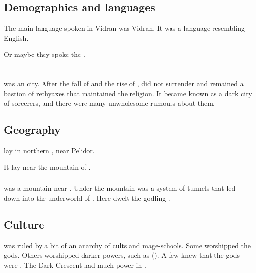 \subsection{Demographics and languages}
The main language spoken in Vidran was Vidran. 
It was a \human language resembling English. 

Or maybe they spoke the .















\section{\Yormis}
\index{\Yormis}
\Yormis was an \Ortaican city.
After the fall of \Ortaica and the rise of \Iquinian \Tepharae, \Yormis did not surrender and remained a bastion of rethyaxes that maintained the \Ortaican religion.
It became known as a dark city of sorcerers, and there were many unwholesome rumours about them.









\subsection{Geography}
\Yormis lay in northern \Velcad, near Pelidor.

It lay near the mountain of .





\subsubsection{\Shrun}
\index{\Shrun}
\Shrun was a mountain near \Yormis. 
Under the mountain was a system of tunnels that led down into the underworld of . 
Here dwelt the \xs godling .









\subsection{Culture}
\Yormis was ruled by a bit of an anarchy of cults and mage-schools.
Some worshipped the \Ortaican gods.
Others worshipped darker powers, such as \Ubloth ().
A few knew that the \Ortaican gods were \xss.
The Dark Crescent had much power in \Yormis.









